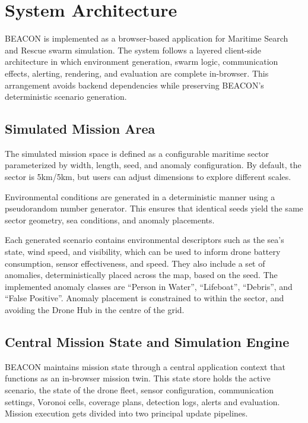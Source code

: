 \section{System Architecture}\label{sec:system-architecture}

BEACON is implemented as a browser-based application for Maritime Search and Rescue swarm simulation.
The system follows a layered client-side architecture in which environment generation, swarm logic, communication effects, alerting, rendering, and evaluation are complete in-browser.
This arrangement avoids backend dependencies while preserving BEACON's deterministic scenario generation.

\subsection{Simulated Mission Area}\label{subsec:simulated-mission-area}

The simulated mission space is defined as a configurable maritime sector parameterized by width, length, seed, and anomaly configuration.
By default, the sector is 5km/5km, but users can adjust dimensions to explore different scales.

Environmental conditions are generated in a deterministic manner using a pseudorandom number generator.
This ensures that identical seeds yield the same sector geometry, sea conditions, and anomaly placements.

Each generated scenario contains environmental descriptors such as the sea's state, wind speed, and visibility, which can be used to inform drone battery consumption, sensor effectiveness, and speed.
They also include a set of anomalies, deterministically placed across the map, based on the seed.
The implemented anomaly classes are ``Person in Water'', ``Lifeboat'', ``Debris'', and ``False Positive''.
Anomaly placement is constrained to within the sector, and avoiding the Drone Hub in the centre of the grid.

\subsection{Central Mission State and Simulation Engine}\label{subsec:central-mission-state-and-simulation-engine}

BEACON maintains mission state through a central application context that functions as an in-browser mission twin.
This state store holds the active scenario, the state of the drone fleet, sensor configuration, communication settings, Voronoi cells, coverage plans, detection logs, alerts and evaluation.
Mission execution gets divided into two principal update pipelines.

